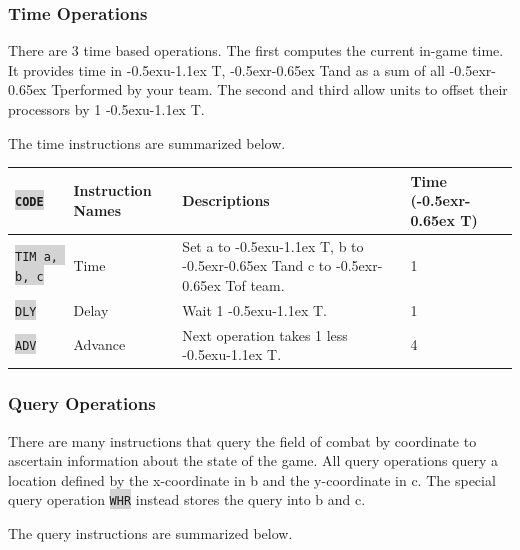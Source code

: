 \documentclass{article}
\newcommand{\vnscode}[1]{\colorbox{lightgray}{\lstinline[language=vns]{#1}}}
\newcommand{\UT}{\lower-0.5ex\hbox{u}\kern-1.1ex T}
\newcommand{\RT}{\lower-0.5ex\hbox{r}\kern-0.65ex T}
\begin{document}
\subsubsection{Time Operations}

There are 3 time based operations. The first computes the current in-game time.
It provides time in \UT, \RT and as a sum of all \RT performed by your team. The
second and third allow units to offset their processors by 1 \UT.

The time instructions are summarized below.

\begin{minipage}{\textwidth}
\label{table:time}
\centering
\begin{tabular}{llll}
    \hline \vnscode{CODE} & Instruction Names & Descriptions & Time (\RT) \\ \hline
    \vnscode{TIM a, b, c} & Time & Set a to \UT, b to \RT and c to \RT of team.  & 1 \\
    \vnscode{DLY} & Delay & Wait 1 \UT. & 1 \\
    \vnscode{ADV} & Advance & Next operation takes 1 less \UT. & 4 \\
\end{tabular}
\end{minipage}

\subsubsection{Query Operations}

There are many instructions that query the field of combat by coordinate to
ascertain information about the state of the game. All query operations
query a location defined by the x-coordinate in b and the y-coordinate in c.
The special query operation \vnscode{WHR} instead stores the query into b and c.

The query instructions are summarized below.
\end{document}
